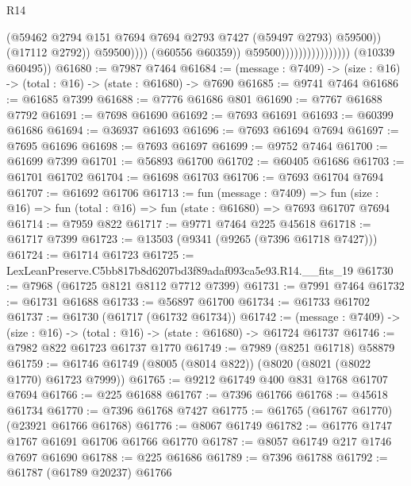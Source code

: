 \begin{lexlean}{R14}
\begin{coremodule}
                                                    (@59462
                                                      @2794
                                                      @151
                                                      @7694
                                                      @7694
                                                      @2793
                                                      @7427
                                                      (@59497 @2793)
                                                      @59500))
                                                  (@17112 @2792))
                                                @59500))))
                                        (@60556 @60359))
                                      @59500))))))))))))))))
      (@10339 @60495))
@61680 := @7987 @7464
@61684 := (message : @7409) -> (size : @16) -> (total : @16) -> (state : @61680) -> @7690
@61685 := @9741 @7464
@61686 := @61685 @7399
@61688 := @7776 @61686 @801
@61690 := @7767 @61688 @7792
@61691 := @7698 @61690
@61692 := @7693 @61691
@61693 := @60399 @61686
@61694 := @36937 @61693
@61696 := @7693 @61694 @7694
@61697 := @7695 @61696
@61698 := @7693 @61697
@61699 := @9752 @7464
@61700 := @61699 @7399
@61701 := @56893 @61700
@61702 := @60405 @61686
@61703 := @61701 @61702
@61704 := @61698 @61703
@61706 := @7693 @61704 @7694
@61707 := @61692 @61706
@61713 := fun (message : @7409) =>
  fun (size : @16) => fun (total : @16) => fun (state : @61680) => @7693 @61707 @7694
@61714 := @7959 @822
@61717 := @9771 @7464 @225 @45618
@61718 := @61717 @7399
@61723 := @13503 (@9341 (@9265 (@7396 @61718 @7427)))
@61724 := @61714 @61723
@61725 := LexLeanPreserve.C5bb817b8d6207bd3f89adaf093ca5e93.R14.__fits_19
@61730 := @7968 (@61725 @8121 @8112 @7712 @7399)
@61731 := @7991 @7464
@61732 := @61731 @61688
@61733 := @56897 @61700
@61734 := @61733 @61702
@61737 := @61730 (@61717 (@61732 @61734))
@61742 := (message : @7409) -> (size : @16) -> (total : @16) -> (state : @61680) -> @61724 @61737
@61746 := @7982 @822 @61723 @61737 @1770
@61749 := @7989 (@8251 @61718) @58879
@61759 := @61746 @61749 (@8005 (@8014 @822)) (@8020 (@8021 (@8022 @1770) @61723 @7999))
@61765 := @9212 @61749 @400 @831 @1768 @61707 @7694
@61766 := @225 @61688
@61767 := @7396 @61766
@61768 := @45618 @61734
@61770 := @7396 @61768 @7427
@61775 := @61765 (@61767 @61770) (@23921 @61766 @61768)
@61776 := @8067 @61749
@61782 := @61776 @1747 @1767 @61691 @61706 @61766 @61770
@61787 := @8057 @61749 @217 @1746 @7697 @61690
@61788 := @225 @61686
@61789 := @7396 @61788
@61792 := @61787 (@61789 @20237) @61766

\end{coremodule}
\end{lexlean}
